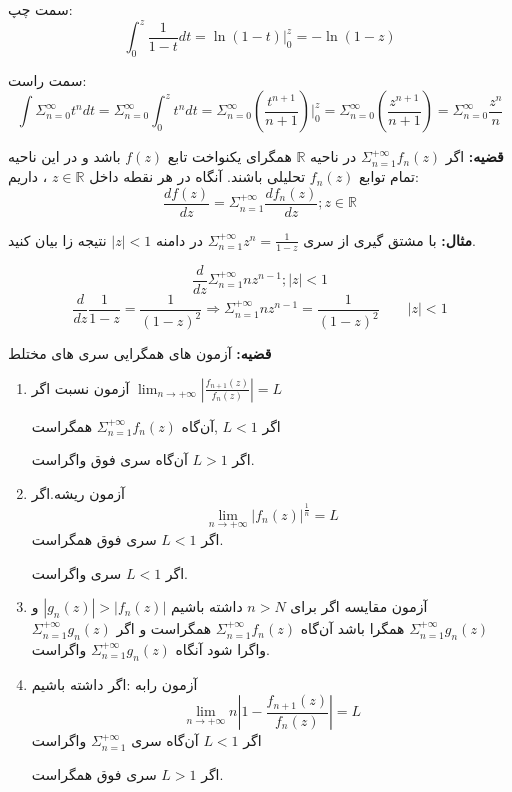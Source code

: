 \documentclass[12pt]{report}
\begin{document}
	سمت چپ:
	$$\int_{0}^{z} \frac{1}{1 - t} dt=\ln (1 - t) |_{0}^{z} = - \ln (1 - z)$$
	\newline
	
	سمت راست:
	$$\int \Sigma_{n = 0}^{\infty} t^n dt = \Sigma_{n = 0}^{\infty} \int_{0}^{z} t^n dt = \Sigma_{n = 0}^{\infty} (\frac{t^{n + 1}}{n+1})|_{0}^{z} =\Sigma_{n = 0}^{\infty} (\frac{z^{n + 1}}{n+1}) = \Sigma_{n = 0}^{\infty} \frac{z^n}{n} $$
	\newline
	
	
	
	
	
	
	
	
	
	
	
	
	
	
	
	
	
	
	
	
	
	
	\textbf{قضیه:}
	اگر 
	$\Sigma_{n = 1}^{+\infty} f_n(z)$
	در ناحیه 
	$\mathbb{R}$
	همگرای یکنواخت تابع 
	$f(z)$
	باشد و در این ناحیه تمام توابع
	$f_n(z)$
	تحلیلی باشند. آنگاه در هر نقطه داخل
	$z \in \mathbb{R}$
	،
	داریم:
	$$\frac{df(z)}{dz} = \Sigma_{n = 1}^{+\infty}\frac{df_n(z)}{dz} ; z \in \mathbb{R}$$
	
	\textbf{مثال:}
	با مشتق گیری از سری 
	$\Sigma_{n = 1}^{+\infty} z^n = \frac{1}{1 - z}$
	در دامنه 
	$|z|<1$
	نتیجه زا بیان کنید.
	
	$$\frac{d}{dz} \Sigma_{n = 1}^{+\infty} n z^{n - 1} ; |z|< 1$$
	$$\frac{d}{dz} \frac{1}{1 - z} = \frac{1}{(1 - z)^2} \Rightarrow \Sigma_{n = 1}^{+\infty} n z^{n - 1} = \frac{1}{(1 - z)^2} \qquad |z|<1$$
	\newline
	
	\textbf{قضیه:}
	آزمون های همگرایی سری های مختلط
	\begin{enumerate}
		\item 
		آزمون نسبت اگر 
		$\lim_{n \to +\infty} |\frac{f_{n +1} (z)}{f_n(z)}| = L$
		
		اگر 
		$L < 1$
		,آن‌گاه
		$\Sigma_{n = 1}^{+\infty} f_n(z)$
		همگراست
		
		اگر 
		$L>1$
		آن‌گاه سری فوق واگراست.
		\item
		آزمون ریشه.اگر
		$$\lim_{n \to +\infty} |f_n(z)|^{\frac{1}{n}}= L$$
		اگر
		$L<1$
		سری فوق همگراست.
		
		اگر
		$L < 1$
		سری واگراست.
		\item
		آزمون مقایسه اگر برای 
		$n > N$
		داشته باشیم
		$|g_n(z)| > |f_n(z)|$
		و
		$\Sigma_{n = 1}^{+\infty} g_n(z)$
		همگرا باشد آن‌گاه
		$\Sigma_{n = 1}^{+\infty} f_n(z)$
		همگراست و اگر
		$\Sigma_{n = 1}^{+\infty} g_n(z)$
		واگرا شود آنگاه
		$\Sigma_{n = 1}^{+\infty} g_n(z)$
		واگراست.
		\item
		آزمون رابه :‌اگر داشته باشیم 
		$$\lim_{n \to +\infty} n |1  - \frac{f_{n +1} (z)}{f_n(z)}| = L$$
		اگر
		$L<1$
		آن‌گاه سری
		$\Sigma_{n = 1}^{+\infty}$
		واگراست
	
		اگر 
		$L > 1$
		سری فوق همگراست.

	\end{enumerate}
	
\end{document}
